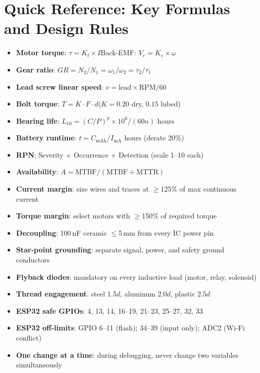 \section{Quick Reference: Key Formulas and Design Rules}

\begin{checklistbox}
\begin{itemize}[leftmargin=*, itemsep=2pt, topsep=0pt]
    \item \textbf{Motor torque}: $\tau = K_t \times I$\quad Back-EMF: $V_e = K_e \times \omega$
    \item \textbf{Gear ratio}: $GR = N_2/N_1 = \omega_1/\omega_2 = \tau_2/\tau_1$
    \item \textbf{Lead screw linear speed}: $v = \text{lead} \times \text{RPM} / 60$
    \item \textbf{Bolt torque}: $T = K \cdot F \cdot d$\quad ($K=0.20$ dry, $0.15$ lubed)
    \item \textbf{Bearing life}: $L_{10} = (C/P)^p \times 10^6 / (60n)$ hours
    \item \textbf{Battery runtime}: $t = C_{\text{mAh}} / I_{\text{mA}}$ hours (derate 20\%)
    \item \textbf{RPN}: Severity $\times$ Occurrence $\times$ Detection (scale 1--10 each)
    \item \textbf{Availability}: $A = \text{MTBF} / (\text{MTBF} + \text{MTTR})$
\end{itemize}
\end{checklistbox}

\begin{checklistbox}
\begin{itemize}[leftmargin=*, itemsep=2pt, topsep=0pt]
    \item \textbf{Current margin}: size wires and traces at $\geq$125\% of max continuous current
    \item \textbf{Torque margin}: select motors with $\geq$150\% of required torque
    \item \textbf{Decoupling}: 100\,nF ceramic $\leq$5\,mm from every IC power pin
    \item \textbf{Star-point grounding}: separate signal, power, and safety ground conductors
    \item \textbf{Flyback diodes}: mandatory on every inductive load (motor, relay, solenoid)
    \item \textbf{Thread engagement}: steel 1.5$d$, aluminum 2.0$d$, plastic 2.5$d$
    \item \textbf{ESP32 safe GPIOs}: 4, 13, 14, 16--19, 21--23, 25--27, 32, 33
    \item \textbf{ESP32 off-limits}: GPIO 6--11 (flash); 34--39 (input only); ADC2 (Wi-Fi conflict)
    \item \textbf{One change at a time}: during debugging, never change two variables simultaneously
\end{itemize}
\end{checklistbox}


